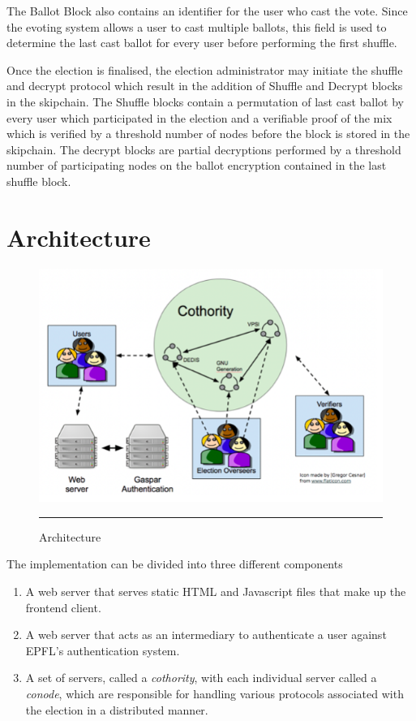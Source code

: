 The Ballot Block also contains an identifier for the user who cast the vote. Since the evoting system allows a user to cast multiple ballots, this field is used to determine the last cast ballot for every user before performing the first shuffle.

Once the election is finalised, the election administrator may initiate the shuffle and decrypt protocol which result in the addition of Shuffle and Decrypt blocks in the skipchain. The Shuffle blocks contain a permutation of last cast ballot by every user which participated in the election and a verifiable proof of the mix which is verified by a threshold number of nodes before the block is stored in the skipchain. The decrypt blocks are partial decryptions performed by a threshold number of participating nodes on the ballot encryption contained in the last shuffle block.

\section{Architecture}

\begin{figure}[ht]
  \centering
    \includegraphics[scale=0.6]{Figures/Architecture.png}
    \rule{35em}{0.5pt}
  \caption[Architecture]{Architecture}
  \label{fig:Architecture}
\end{figure}

The implementation can be divided into three different components

\begin{enumerate}
  \item A web server that serves static HTML and Javascript files that make up the frontend client.
  \item A web server that acts as an intermediary to authenticate a user against EPFL’s authentication system.
  \item A set of servers, called a \textit{cothority}, with each individual server called a \textit{conode}, which are responsible for handling various protocols associated with the election in a distributed manner.
\end{enumerate}

